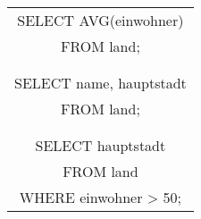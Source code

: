 {{\begin{tabularx}{\textwidth}{C}
                SELECT AVG(einwohner) \\
                FROM land; \\\\\hline\\
                SELECT name, hauptstadt \\
                FROM land;\\\\\hline\\
                SELECT hauptstadt \\
                FROM land \\
                WHERE einwohner > 50;
            \end{tabularx}
        }
    \fi
}
